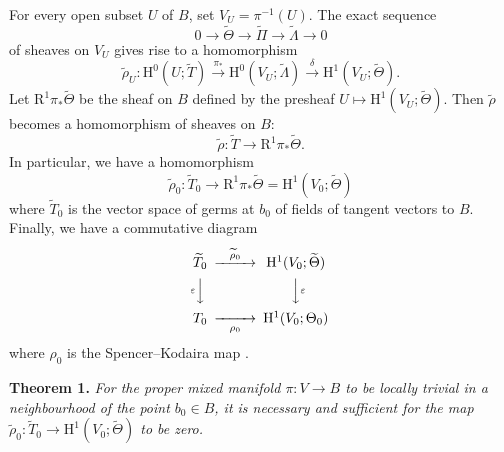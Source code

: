 \documentclass[british]{article}
\newenvironment{itenv}[1]
  {\phantomsection\par\smallskip\noindent\textbf{#1.}\itshape}
  {\par\smallskip}
\newcommand{\oldpage}[1]{\marginpar{\footnotesize$\Big\vert$ \textit{p.~#1}}}
\begin{document}
For every open subset \(U\) of \(B\), set \(V_U=\pi^{-1}(U)\). The exact
sequence \[
  0 \to \widetilde{\Theta} \to \widetilde{\Pi} \to \widetilde{\Lambda} \to 0
\] of sheaves on \(V_U\) gives rise to a homomorphism \[
  \widetilde{\rho}_U\colon
  \mathrm{H}^0(U;\widetilde{T})
  \xrightarrow{\pi_*} \mathrm{H}^0(V_U;\widetilde{\Lambda})
  \xrightarrow{\delta} \mathrm{H}^1(V_U;\widetilde{\Theta}).
\] Let \(\mathrm{R}^1\pi_*\widetilde{\Theta}\) be the sheaf on \(B\)
defined by the presheaf
\(U\mapsto\mathrm{H}^1(V_U;\widetilde{\Theta})\). Then
\(\widetilde{\rho}\) becomes a homomorphism of sheaves on \(B\): \[
  \widetilde{\rho}\colon \widetilde{T} \to \mathrm{R}^1\pi_*\widetilde{\Theta}.
\] In particular, we have a homomorphism \[
  \widetilde{\rho}_0\colon
  \widetilde{T}_0
  \to \mathrm{R}^1\pi_*\widetilde{\Theta}
  = \mathrm{H}^1(V_0;\widetilde{\Theta})
\] where \(\widetilde{T}_0\) is the vector space of germs at \(b_0\) of
fields of tangent vectors to \(B\). \oldpage{3-02} Finally, we have a
commutative diagram \[
  \begin{CD}
    \widetilde{T}_0 @>{\widetilde{\rho}_0}>> \mathrm{H}^1(V_0;\widetilde{\Theta})
  \\@V{\varepsilon}VV @VV{\varepsilon}V
  \\T_0 @>>{\rho_0}> \mathrm{H}^1(V_0;\Theta_0)
  \end{CD}
\] where \(\rho_0\) is the Spencer--Kodaira map \autocite{3-2}.

\protect{}\label{three-theorem-1}
\begin{itenv}{Theorem 1}
For the proper mixed manifold \(\pi\colon V\to B\) to be locally trivial
in a neighbourhood of the point \(b_0\in B\), it is necessary and
sufficient for the map
\(\widetilde{\rho}_0\colon\widetilde{T}_0\to\mathrm{H}^1(V_0;\widetilde{\Theta})\)
to be zero.

\end{itenv}
\end{document}
